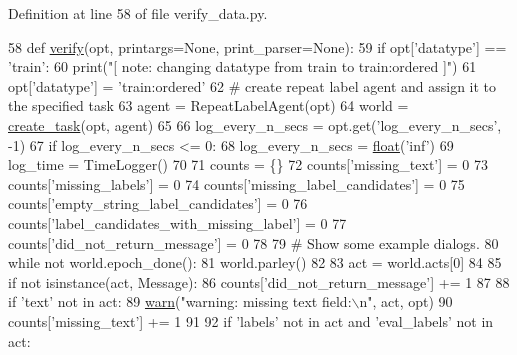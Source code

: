 Definition at line 58 of file verify\+\_\+data.\+py.


\begin{DoxyCode}
58 \textcolor{keyword}{def }\hyperlink{namespaceparlai_1_1scripts_1_1verify__data_acf6da63d62b2bf71c8fb7860e944a5bf}{verify}(opt, printargs=None, print\_parser=None):
59     \textcolor{keywordflow}{if} opt[\textcolor{stringliteral}{'datatype'}] == \textcolor{stringliteral}{'train'}:
60         print(\textcolor{stringliteral}{"[ note: changing datatype from train to train:ordered ]"})
61         opt[\textcolor{stringliteral}{'datatype'}] = \textcolor{stringliteral}{'train:ordered'}
62     \textcolor{comment}{# create repeat label agent and assign it to the specified task}
63     agent = RepeatLabelAgent(opt)
64     world = \hyperlink{namespaceparlai_1_1core_1_1worlds_a79969c7ba76d4b3c500f5bb776444dc6}{create\_task}(opt, agent)
65 
66     log\_every\_n\_secs = opt.get(\textcolor{stringliteral}{'log\_every\_n\_secs'}, -1)
67     \textcolor{keywordflow}{if} log\_every\_n\_secs <= 0:
68         log\_every\_n\_secs = \hyperlink{namespaceprojects_1_1controllable__dialogue_1_1make__control__dataset_aa2b7207688c641dbc094ab44eca27113}{float}(\textcolor{stringliteral}{'inf'})
69     log\_time = TimeLogger()
70 
71     counts = \{\}
72     counts[\textcolor{stringliteral}{'missing\_text'}] = 0
73     counts[\textcolor{stringliteral}{'missing\_labels'}] = 0
74     counts[\textcolor{stringliteral}{'missing\_label\_candidates'}] = 0
75     counts[\textcolor{stringliteral}{'empty\_string\_label\_candidates'}] = 0
76     counts[\textcolor{stringliteral}{'label\_candidates\_with\_missing\_label'}] = 0
77     counts[\textcolor{stringliteral}{'did\_not\_return\_message'}] = 0
78 
79     \textcolor{comment}{# Show some example dialogs.}
80     \textcolor{keywordflow}{while} \textcolor{keywordflow}{not} world.epoch\_done():
81         world.parley()
82 
83         act = world.acts[0]
84 
85         \textcolor{keywordflow}{if} \textcolor{keywordflow}{not} isinstance(act, Message):
86             counts[\textcolor{stringliteral}{'did\_not\_return\_message'}] += 1
87 
88         \textcolor{keywordflow}{if} \textcolor{stringliteral}{'text'} \textcolor{keywordflow}{not} \textcolor{keywordflow}{in} act:
89             \hyperlink{namespaceparlai_1_1scripts_1_1verify__data_ab1f264e6d69b1abe3399ba05512f8c66}{warn}(\textcolor{stringliteral}{"warning: missing text field:\(\backslash\)n"}, act, opt)
90             counts[\textcolor{stringliteral}{'missing\_text'}] += 1
91 
92         \textcolor{keywordflow}{if} \textcolor{stringliteral}{'labels'} \textcolor{keywordflow}{not} \textcolor{keywordflow}{in} act \textcolor{keywordflow}{and} \textcolor{stringliteral}{'eval\_labels'} \textcolor{keywordflow}{not} \textcolor{keywordflow}{in} act:

\end{DoxyCode}
